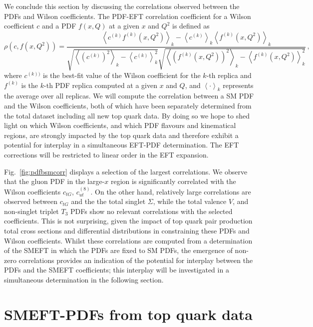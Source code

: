 \documentclass[withindex,glossary]{cam-thesis}
\newcommand{\la}{\left\langle}
\newcommand{\ra}{\right\rangle}
\begin{document}
We conclude this section by discussing the correlations observed between the PDFs and Wilson coefficients.
The PDF-EFT correlation coefficient for a Wilson coefficient $c$ and a
PDF $f(x, Q)$ at a given $x$ and $Q^2$ is defined as
%
\begin{equation}
\label{eq:correlationL2CT}
\rho\left( c, f(x,Q^2)\right)=\frac{\la c^{(k)}f^{(k)}(x,Q^2)\ra_k - \la c^{(k)}\ra_k \la f^{(k)}(x,Q^2)\ra_k
}{\sqrt{\la (c^{(k)})^2\ra_k - \la c^{(k)}\ra_k^2}\sqrt{\la\left( f^{(k)}(x,Q^2)\right)^2\ra_k - \la f^{(k)}(x,Q^2)\ra_k^2}}  \, ,
\end{equation}
%
where $c^{(k))}$ is the best-fit value of the Wilson coefficient for
the $k$-th replica and $f^{(k)}$ is the $k$-th PDF replica computed at
a given $x$ and $Q$, and $\la \cdot \ra_k$ represents the average
over all replicas. We will compute the correlation between a SM PDF and the Wilson coefficients, both of which have been separately determined from 
the total dataset including all new top quark data.  
By doing so we hope to shed light on which Wilson coefficients,
and which PDF flavours and kinematical regions, are strongly impacted by the top quark data and therefore exhibit a potential for interplay
in a simultaneous EFT-PDF determination.
The EFT corrections will be
restricted to linear order in the EFT expansion.

Fig.~\ref{fig:pdfbsmcorr} displays a selection of the largest correlations.
We observe that the gluon PDF in the large-$x$ region is significantly correlated with the Wilson coefficients 
$c_{tG}$, $c_{ut}^{(8)}$.  On the other hand, relatively large correlations are observed between $c_{tG}$ and the
the total singlet $\Sigma$, while the total valence $V$, and non-singlet triplet $T_3$ PDFs show no relevant correlations
with the selected coefficients.
This is not surprising, given the impact of top quark pair production total cross sections and differential distributions
in constraining these PDFs and Wilson coefficients.  
Whilst these correlations are computed from a determination of the SMEFT in which the PDFs are fixed to SM PDFs, 
the emergence of non-zero correlations provides an indication of the potential for interplay between the PDFs and the SMEFT
coefficients; this interplay will be investigated in a simultaneous determination
in the following section.



\section{SMEFT-PDFs from top quark data}
\label{sec:joint_pdf_smeft}
\end{document}
